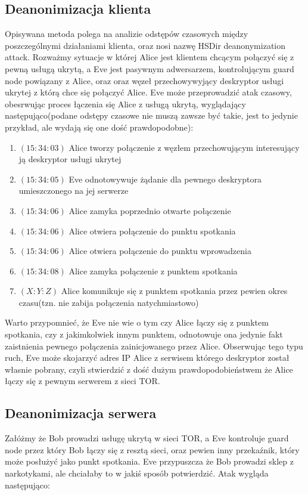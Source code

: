 \documentclass[polish]{kbk}
\begin{document}
\subsection{Deanonimizacja klienta}
Opisywana metoda polega na analizie odstępów czasowych między poszczególnymi działaniami
klienta, oraz nosi nazwę HSDir deanonymization attack\cite{tortalk}.
Rozważmy sytuacje w której Alice jest klientem chcącym połączyć się z pewną usługą 
ukrytą, a Eve jest pasywnym adwersarzem, kontrolującym guard node powiązany z Alice,
oraz oraz węzeł przechowywyjący deskryptor usługi ukrytej z którą chce się połączyć
Alice. Eve może przeprowadzić atak czasowy, obesrwując proces łączenia się Alice z
usługą ukrytą, wyglądający następująco(podane odstępy czasowe nie muszą zawsze być takie,
jest to jedynie przykład, ale wydają się one dość prawdopodobne):
\begin{enumerate}
\item $(15:34:03)$ Alice tworzy połączenie z węzłem przechowującym interesujący ją
deskryptor usługi ukrytej
\item $(15:34:05)$ Eve odnotowywuje żądanie dla pewnego deskryptora umieszczonego na
jej serwerze
\item $(15:34:06)$ Alice zamyka poprzednio otwarte połączenie
\item $(15:34:06)$ Alice otwiera połączenie do punktu spotkania
\item $(15:34:06)$ Alice otwiera połączenie do punktu wprowadzenia
\item $(15:34:08)$ Alice zamyka połączenie z punktem spotkania
\item $(X:Y:Z)$ Alice komunikuje się z punktem spotkania przez pewien okres czasu(tzn. 
nie zabija połączenia natychmiastowo)
\end{enumerate}

Warto przypomnieć, że Eve nie wie o tym czy Alice łączy się z punktem spotkania, czy 
z jakimkolwiek innym punktem, odnotowuje ona jedynie fakt zaistnienia pewnego połączenia 
zainicjowanego przez Alice. Obserwując tego typu ruch, Eve może skojarzyć adres IP
Alice z serwisem którego deskryptor został własnie pobrany, czyli stwierdzić z dość
dużym prawdopodobieństwem że Alice łączy się z pewnym serwerem z sieci TOR.

\subsection{Deanonimizacja serwera}
Załóżmy że Bob prowadzi usługę ukrytą w sieci TOR, a Eve kontroluje guard node przez
który Bob łączy się z resztą sieci, oraz pewien inny przekaźnik, który może posłużyć
jako punkt spotkania. Eve przypuszcza że Bob prowadzi sklep z narkotykami, ale 
chciałaby to w jakiś sposób potwierdzić. Atak wygląda następująco:
\end{document}
